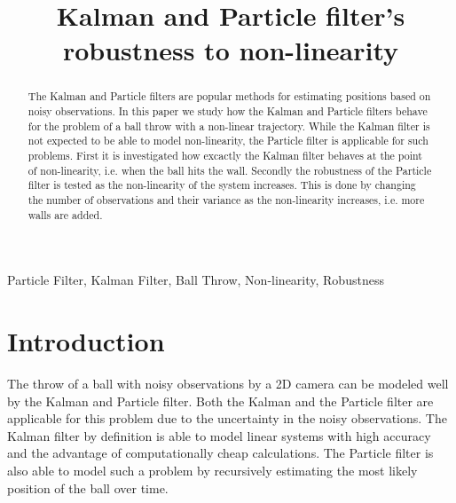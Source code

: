 \documentclass[conference]{IEEEtran}
\begin{document}
\title{Kalman and Particle filter's robustness to non-linearity}

\author{
}
\maketitle

\begin{abstract}

The Kalman and Particle filters are popular methods for estimating positions based on noisy observations. 
In this paper we study how the Kalman and Particle filters behave for the problem of a ball throw with a non-linear trajectory. 
While the Kalman filter is not expected to be able to model non-linearity, the Particle filter is applicable for such problems. 
First it is investigated how excactly the Kalman filter behaves at the point of non-linearity, i.e. when the ball hits the wall.
Secondly the robustness of the Particle filter is tested as the non-linearity of the system increases.
This is done by changing the number of observations and their variance as the non-linearity increases, i.e. more walls are added.

\end{abstract}

\begin{IEEEkeywords}
Particle Filter, Kalman Filter, Ball Throw, Non-linearity, Robustness
\end{IEEEkeywords}

\section{Introduction}
The throw of a ball with noisy observations by a 2D camera can be modeled well by the Kalman and Particle filter. 
Both the Kalman and the Particle filter are applicable for this problem due to the uncertainty in the noisy observations.
The Kalman filter by definition is able to model linear systems with high accuracy and the advantage of computationally cheap calculations. 
The Particle filter is also able to model such a problem by recursively estimating the most likely position of the ball over time.
\end{document}
